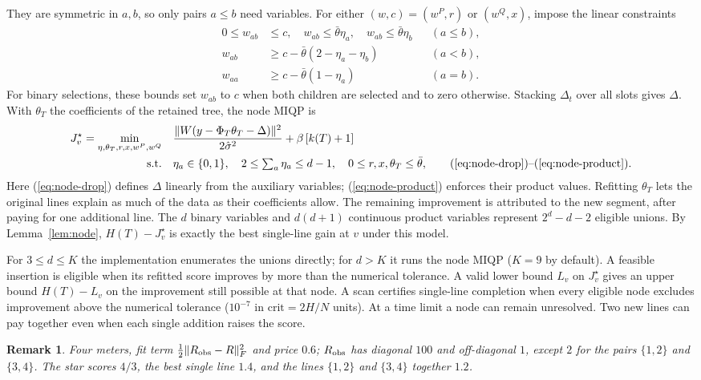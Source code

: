 \documentclass[journal,onecolumn,11pt]{IEEEtran}
\newtheorem{remark}{Remark}
\begin{document}
They are symmetric in $a,b$, so only pairs $a\le b$ need variables. For either
$(w,c)=(w^P,r)$ or $(w^Q,x)$, impose the linear constraints
\begin{equation}\label{eq:node-product}
\begin{aligned}
0\le w_{ab}&\le c,\quad w_{ab}\le\bar\theta\eta_a,\quad w_{ab}\le\bar\theta\eta_b &&(a\le b),\\
w_{ab}&\ge c-\bar\theta(2-\eta_a-\eta_b) &&(a<b),\\
w_{aa}&\ge c-\bar\theta(1-\eta_a) &&(a=b).
\end{aligned}
\end{equation}
For binary selections, these bounds set $w_{ab}$ to $c$ when both children are selected and to zero otherwise.
Stacking $\Delta_t$ over all slots gives $\Delta$. With $\theta_T$ the coefficients of the retained tree, the node MIQP is
\begin{equation}\label{eq:node-miqp}
\begin{aligned}
J_v^\star=\min_{\eta,\theta_T,r,x,w^P,w^Q}\quad&
  \frac{\|W(y-\Phi_T\theta_T-\Delta)\|^2}{2\hat\sigma^2}+\beta\,[k(T)+1]\\
\text{s.t.}\quad&
  \eta_a\in\{0,1\},\quad 2\le\textstyle\sum_a\eta_a\le d-1,\quad
  0\le r,x,\theta_T\le\bar\theta,\qquad
  \text{(\ref{eq:node-drop})--(\ref{eq:node-product})}.
\end{aligned}
\end{equation}
Here (\ref{eq:node-drop}) defines $\Delta$ linearly from the auxiliary variables; (\ref{eq:node-product}) enforces
their product values. Refitting $\theta_T$ lets the original lines explain as much of the data as their coefficients
allow. The remaining improvement is attributed to the new segment, after paying for one additional line.
The $d$ binary variables and $d(d+1)$ continuous product variables represent $2^d-d-2$ eligible unions.
By Lemma~\ref{lem:node}, $H(T)-J_v^\star$ is exactly the best single-line gain at $v$ under this model.

For $3\le d\le K$ the implementation enumerates the unions directly; for $d>K$ it runs the node MIQP
($K=9$ by default). A feasible insertion is eligible when its refitted score improves by more than the numerical tolerance.
A valid lower bound $L_v$ on $J_v^\star$ gives an upper bound $H(T)-L_v$ on the improvement still possible
at that node. A scan certifies single-line completion when every eligible node excludes improvement
above the numerical tolerance ($10^{-7}$ in $\mathrm{crit}=2H/N$ units). At a time limit a node can
remain unresolved. Two new lines can pay together even when each single addition raises the score.
\begin{remark}\label{rem:pairs}
Four meters, fit term $\tfrac12\|R_{\rm obs}-R\|_F^2$ and price $0.6$; $R_{\rm obs}$ has diagonal $100$ and off-diagonal
$1$, except $2$ for the pairs $\{1,2\}$ and $\{3,4\}$. The star scores $4/3$, the best single line $1.4$, and the lines
$\{1,2\}$ and $\{3,4\}$ together $1.2$.
\end{remark}
\end{document}

